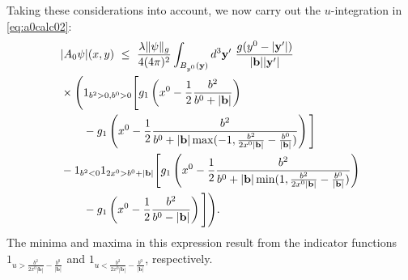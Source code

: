 \documentclass[b5paper,draft,openbib,12pt]{memoir}
\newcommand{\vy}{\mathbf{y}}
\newcommand{\vb}{\mathbf{b}}
\begin{document}
Taking these considerations into account, we now carry 
out the $u$-integration in \eqref{eq:a0calc02}:
\begin{align}
    &|A_0\psi|(x,y) ~\le~ \frac{\lambda \|\psi\|_g}{4(4\pi)^2} \int_{B_{y^0}(\vy)}d^3\vy'~ \frac{g(y^0-|\vy'|)}{|\vb||\vy'|} \notag\\
    &\times \Bigg(1_{b^2>0,b^0>0} \Bigg[g_1\left(x^0-\frac{1}{2} \frac{b^2}{b^0+|\vb|}\right) \notag\\
    &\quad \quad - g_1\left( x^0 - \frac{1}{2}\frac{b^2}{b^0+|\vb| \max (-1, \frac{b^2}{2x^0|\vb|} - \frac{b^0}{|\vb|})}\right)\Bigg]\notag\\
    & -1_{b^2<0}1_{2x^0>b^0+|\vb|}\Bigg[
    g_1\left(x^0-\frac{1}{2} \frac{b^2}{b^0+|\vb| \min(1, \frac{b^2}{2x^0|\vb|}-\frac{b^0}{|\vb|})}\right)\notag\\
    &\quad \quad - g_1\left(x^0-\frac{1}{2} \frac{b^2}{b^0-|\vb|} \right)\Bigg]\Bigg).
\label{eq:a0calc03}
\end{align}
The minima and maxima in this expression result from 
the indicator functions $1_{u > \frac{b^2}{2x^0|\vb|} 
- \frac{b^0}{|\vb|}}$ and $1_{u<\frac{b^2}{2x^0|\vb|} 
- \frac{b^0}{|\vb|}}$, respectively.
\end{document}

